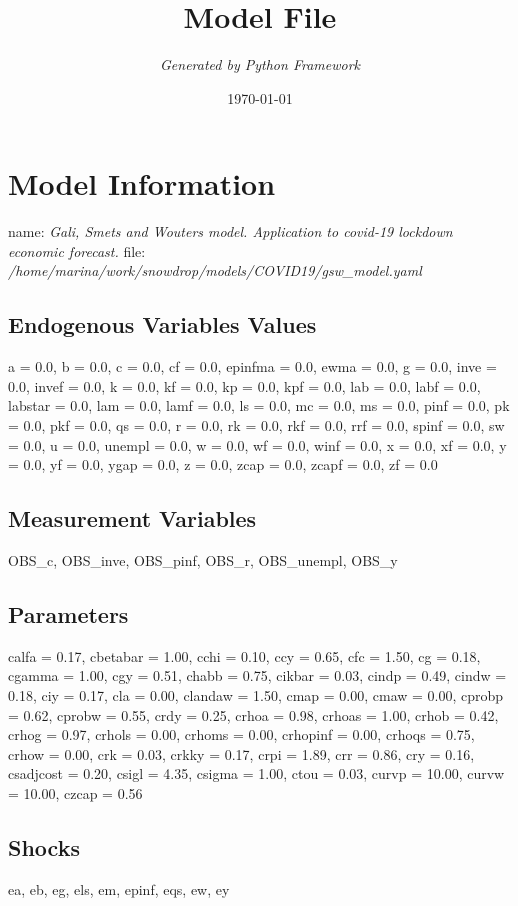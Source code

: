 \documentclass{article}%
\title{\textbf{Model File}}%
\author{\textit{Generated by Python Framework}}%
\date{\today}%
\begin{document}
%
\normalsize%
\maketitle%
\section{Model Information}%
\label{sec:ModelInformation}%
name: %
\textit{Gali, Smets and Wouters model.  Application to covid{-}19 lockdown economic forecast.}%
\newline%
file: %
\textit{/home/marina/work/snowdrop/models/COVID19/gsw\_model.yaml}%
\subsection{Endogenous Variables Values}%
\label{subsec:EndogenousVariablesValues}%
a = 0.0, b = 0.0, c = 0.0, cf = 0.0, epinfma = 0.0, ewma = 0.0, g = 0.0, inve = 0.0, invef = 0.0, k = 0.0, kf = 0.0, kp = 0.0, kpf = 0.0, lab = 0.0, labf = 0.0, labstar = 0.0, lam = 0.0, lamf = 0.0, ls = 0.0, mc = 0.0, ms = 0.0, pinf = 0.0, pk = 0.0, pkf = 0.0, qs = 0.0, r = 0.0, rk = 0.0, rkf = 0.0, rrf = 0.0, spinf = 0.0, sw = 0.0, u = 0.0, unempl = 0.0, w = 0.0, wf = 0.0, winf = 0.0, x = 0.0, xf = 0.0, y = 0.0, yf = 0.0, ygap = 0.0, z = 0.0, zcap = 0.0, zcapf = 0.0, zf = 0.0

%
\subsection{Measurement Variables}%
\label{subsec:MeasurementVariables}%
OBS\_c, OBS\_inve, OBS\_pinf, OBS\_r, OBS\_unempl, OBS\_y

%
\subsection{Parameters}%
\label{subsec:Parameters}%
calfa = 0.17, cbetabar = 1.00, cchi = 0.10, ccy = 0.65, cfc = 1.50, cg = 0.18, cgamma = 1.00, cgy = 0.51, chabb = 0.75, cikbar = 0.03, cindp = 0.49, cindw = 0.18, ciy = 0.17, cla = 0.00, clandaw = 1.50, cmap = 0.00, cmaw = 0.00, cprobp = 0.62, cprobw = 0.55, crdy = 0.25, crhoa = 0.98, crhoas = 1.00, crhob = 0.42, crhog = 0.97, crhols = 0.00, crhoms = 0.00, crhopinf = 0.00, crhoqs = 0.75, crhow = 0.00, crk = 0.03, crkky = 0.17, crpi = 1.89, crr = 0.86, cry = 0.16, csadjcost = 0.20, csigl = 4.35, csigma = 1.00, ctou = 0.03, curvp = 10.00, curvw = 10.00, czcap = 0.56

%
\subsection{Shocks}%
\label{subsec:Shocks}%
ea, eb, eg, els, em, epinf, eqs, ew, ey
\end{document}
